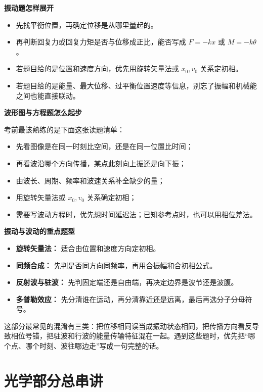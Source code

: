 \documentclass[lang=cn,11pt]{elegantbook}
\begin{document}
\textbf{振动题怎样展开}

\begin{itemize}
 \item 先找平衡位置，再确定位移是从哪里量起的。
 \item 再判断回复力或回复力矩是否与位移成正比，能否写成 \(F=-kx\) 或 \(M=-k\theta\)。
 \item 若题目给的是位置和速度方向，优先用旋转矢量法或 \(x_0,v_0\) 关系定初相。
 \item 若题目给的是能量、最大位移、过平衡位置速度等信息，别忘了振幅和机械能之间也能直接联动。
\end{itemize}

\textbf{波形图与方程题怎么起步}

考前最该熟练的是下面这张读题清单：
\begin{itemize}
 \item 先看图像是在同一时刻比空间，还是在同一位置比时间；
 \item 再看波沿哪个方向传播，某点此刻向上振还是向下振；
 \item 由波长、周期、频率和波速关系补全缺少的量；
 \item 用旋转矢量法或 \(x_0,v_0\) 关系确定初相；
 \item 需要写波动方程时，优先想时间延迟法；已知参考点时，也可以用相位差法。
\end{itemize}

\textbf{振动与波动的重点题型}

\begin{itemize}
 \item \textbf{旋转矢量法：} 适合由位置和速度方向定初相。
 \item \textbf{同频合成：} 先判是否同方向同频率，再用合振幅和合初相公式。
 \item \textbf{反射波与驻波：} 先判固定端还是自由端，再决定边界是波节还是波腹。
 \item \textbf{多普勒效应：} 先分清谁在运动，再分清靠近还是远离，最后再选分子分母符号。
\end{itemize}

\begin{remark}
这部分最常见的混淆有三类：把位移相同误当成振动状态相同，把传播方向看反导致相位号错，把驻波和行波的能量传输特征混在一起。遇到这些题时，优先把“哪个点、哪个时刻、波往哪边走”写成一句完整的话。
\end{remark}

\section{光学部分总串讲}
\end{document}
